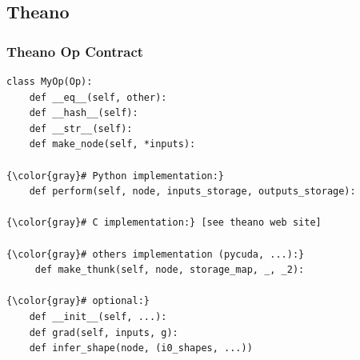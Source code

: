 \documentclass[a4paper,9pt]{beamer}
\begin{document}
\subsection{Theano}

\begin{frame}[fragile]
\frametitle{Theano Op Contract}
\begin{Verbatim}[commandchars=\\\{\}]
class MyOp(Op):
    def __eq__(self, other):
    def __hash__(self):
    def __str__(self):
    def make_node(self, *inputs):

{\color{gray}# Python implementation:}
    def perform(self, node, inputs_storage, outputs_storage):

{\color{gray}# C implementation:} [see theano web site]

{\color{gray}# others implementation (pycuda, ...):}
     def make_thunk(self, node, storage_map, _, _2):

{\color{gray}# optional:}
    def __init__(self, ...):
    def grad(self, inputs, g):
    def infer_shape(node, (i0_shapes, ...))
\end{Verbatim}
\end{frame}
\end{document}
